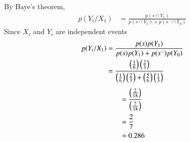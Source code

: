 \documentclass[journal,12pt,twocolumn]{IEEEtran}
\theoremstyle{remark}
\begin{document}
By Baye's theorem, 
\begin{align} 
p(Y_i / X_1) &= \frac{p(s \cap Y_1)}{p(s \cap Y_1) + p(s^- \cap Y_0)}
\end{align}
Since $X_i$ and $Y_i$ are independent events
\begin{align}
p(Y_i / X_1) &= \frac{p(s)p(Y_1)}{p(s)p(Y_1) + p(s^-)p(Y_0)}\\
             &= \frac{\left(\frac{1}{6}\right) \left(\frac{2}{3}\right)}{\left(\frac{1}{6}\right) \left(\frac{2}{3}\right) + \left(\frac{5}{6}\right) \left(\frac{1}{3}\right)}
\end{align}
\begin{align}
&= \frac{\left(\frac{2}{18}\right)}{\left(\frac{7}{18}\right)}\\
&= \frac{2}{7}\\
&\approx 0.286
\end{align}
\end{document}
